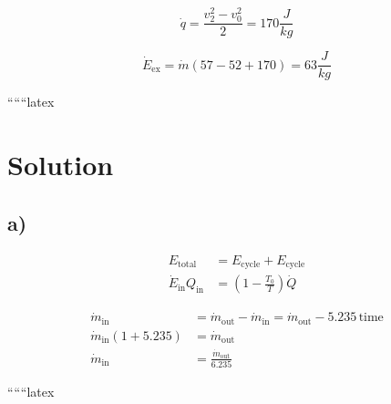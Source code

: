 \[
\dot{q} = \frac{v_2^2 - v_0^2}{2} = 170 \frac{J}{kg}
\]

\[
\dot{E}_{\text{ex}} = \dot{m} \left( 57 - 52 + 170 \right) = 63 \frac{J}{kg}
\]

``````latex

\section*{Solution}

\subsection*{a)}

\begin{align*}
    E_{\text{total}} &= E_{\text{cycle}} + E_{\text{cycle}} \\
    \dot{E}_\text{in} Q_\text{in} &= \left(1 - \frac{T_0}{T}\right) \dot{Q}
\end{align*}


\begin{align*}
    \dot{m}_\text{in} &= \dot{m}_\text{out} - \dot{m}_\text{in} = \dot{m}_\text{out} - 5.235 \, \text{time} \\
    \dot{m}_\text{in} \left(1 + 5.235\right) &= \dot{m}_\text{out} \\
    \dot{m}_\text{in} &= \frac{\dot{m}_\text{out}}{6.235}
\end{align*}

``````latex


